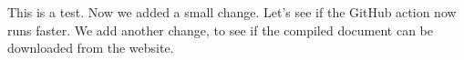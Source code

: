 \documentclass{article}
\begin{document}
This is a test.
Now we added a small change.
Let's see if the GitHub action now runs faster.
We add another change, to see if the compiled document can be downloaded from the website.
\end{document}
